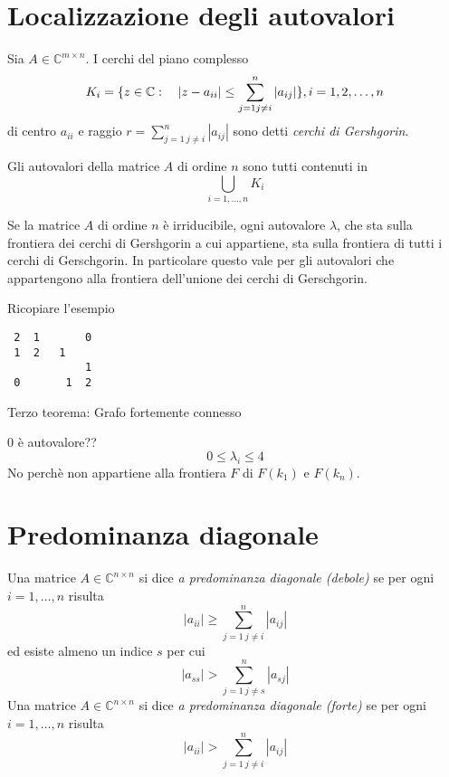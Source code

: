 \section{Localizzazione degli autovalori}
\begin{defn}
Sia $A \in \mathbb{C}^{m \times n}$. I cerchi del piano complesso
 $$K_i = \{ z \in \mathbb{C} :  \quad  |z - a_{ii}| \leq 
\displaystyle \sum_{j=1 \\ j\neq i}^{n} |a_{ij}| \}, i = 1,2, \ldots, n
$$ 
di centro $a_{ii}$ e raggio $r= \displaystyle\sum_{j=1 ~ j\neq i}^{n} |a_{ij}|$ 
sono detti \emph{cerchi di Gershgorin}.
\end{defn}



\begin{theo}
Gli autovalori della matrice $A$ di ordine $n$ sono tutti contenuti in
$$ \displaystyle \bigcup_{i= 1, \ldots, n} K_{i}$$
\end{theo}


\begin{theo}
Se la matrice $A$ di ordine $n$ \`e irriducibile, ogni autovalore $\lambda$,
che sta sulla frontiera dei cerchi di Gershgorin a cui appartiene, sta sulla
frontiera di tutti i cerchi di Gerschgorin. In particolare questo
vale per gli autovalori che appartengono alla frontiera dell'unione dei cerchi
di Gerschgorin.
\end{theo}

\begin{example}
\begin{notes}
 Ricopiare l'esempio
\end{notes}

\begin{Verbatim}
 2  1       0
 1  2   1   
            1  
 0       1  2
\end{Verbatim}

Terzo teorema: Grafo fortemente connesso

0 \`e autovalore??
$$ 0 \leq \lambda_i \leq 4 $$
No perch\`e non appartiene alla frontiera $F$  di 
$F(k_1)$ e $F(k_n)$.
\end{example}

\section{Predominanza diagonale}

\begin{defn}
Una matrice $A \in \mathbb{C}^{n \times n}$ si dice
\emph{a predominanza diagonale (debole)} se per ogni $i=1, \ldots ,n$ risulta
$$ |a_{ii}|  \geq \displaystyle \sum_{j=1~ j \neq i}^n  | a_{ij} | $$
ed esiste almeno un indice $s$ per cui
$$ |a_{ss}| > \displaystyle \sum_{j=1 ~ j \neq s}^{n} |a_{sj}|$$
Una matrice $A \in \mathbb{C}^{n \times n}$ si dice
\emph{a predominanza diagonale (forte)} se per ogni $i=1, \ldots ,n$ risulta
$$ |a_{ii}|  > \displaystyle \sum_{j=1~ j \neq i}^n  | a_{ij} | $$
\end{defn}

